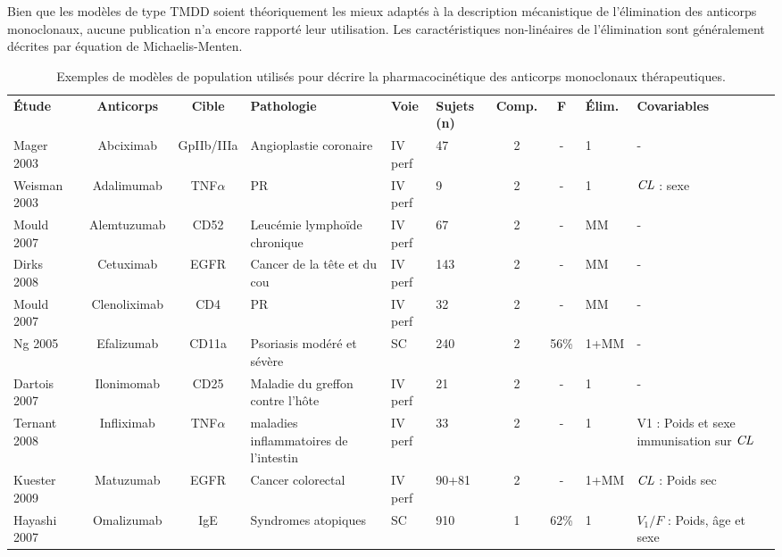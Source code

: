 Bien que les modèles de type TMDD soient théoriquement les mieux adaptés à la description mécanistique de l'élimination des anticorps monoclonaux, aucune publication n'a encore rapporté leur utilisation. Les caractéristiques non-linéaires de l'élimination sont généralement décrites par équation de Michaelis-Menten.  

\begin{table}[!ht]
  \centering
  \caption{Exemples de modèles de population utilisés pour décrire la pharmacocinétique des anticorps monoclonaux thérapeutiques.}
    \begin{tabular}{p{1.6cm}ccp{1.8cm}p{.8cm}p{.9cm}ccp{.9cm}l}
      &&&&&&&&& \\
      \hline
\textbf{Étude} & \textbf{Anticorps} & \textbf{Cible} & \textbf{Pathologie} & \textbf{Voie} & \textbf{Sujets (n)} & \textbf{Comp.} & \textbf{F} & \textbf{Élim.} & \textbf{Covariables} \\
      \hline
      \hline
      Mager 2003~\citep{REF65} & Abciximab & GpIIb/IIIa & Angioplastie coronaire & \gls{IV} perf & 47 & 2 & - & 1 & - \\
      Weisman 2003~\citep{REF66} & Adalimumab & TNF$\alpha$ & PR & \gls{IV} perf & 9 & 2 & - & 1 & $\operatorname{\textit{CL}}$ : sexe \\
      Mould 2007~\citep{REF67} & Alemtuzumab & CD52 & Leucémie lymphoïde chronique & \gls{IV} perf & 67 & 2 & - & MM & - \\
      Dirks 2008~\citep{REF68} & Cetuximab & EGFR & Cancer de la tête et du cou & \gls{IV} perf & 143 & 2 & - & MM & - \\
      Mould 2007~\citep{REF69} & Clenoliximab & CD4 & PR & \gls{IV} perf & 32 & 2 & - & MM & - \\
      Ng 2005~\citep{REF50} & Efalizumab & CD11a & Psoriasis modéré et sévère & SC & 240 & 2 & 56\% & 1+MM & - \\
      Dartois 2007~\citep{REF70} & Ilonimomab & CD25 & Maladie du greffon contre l'hôte & \gls{IV} perf & 21 & 2 & - & 1 & - \\
      Ternant 2008~\citep{REF71} & Infliximab & TNF$\alpha$ & maladies inflammatoires de l'intestin & \gls{IV} perf & 33 & 2 & - & 1 & V1 : Poids et sexe immunisation sur $\operatorname{\textit{CL}}$ \\
      Kuester 2009~\citep{REF72} & Matuzumab & EGFR & Cancer colorectal & \gls{IV} perf & 90+81 & 2 & - & 1+MM & $\operatorname{\textit{CL}}$ : Poids sec \\
      Hayashi 2007~\citep{REF61} & Omalizumab & IgE & Syndromes atopiques & SC & 910 & 1 & 62\% & 1 & $V_1/F$ : Poids,  âge et sexe \\

\end{tabular}
\end{table}
